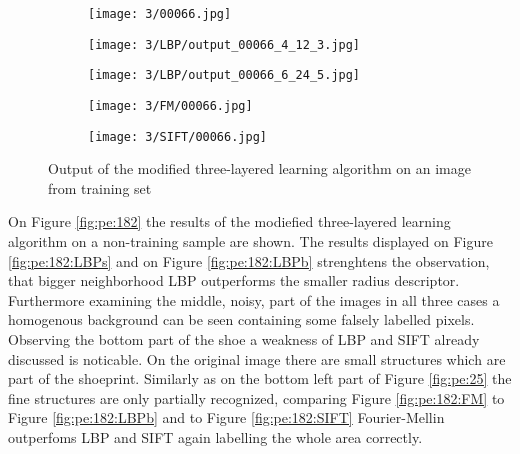 \documentclass[draft,final]{vutinfth} %
\begin{document}
\begin{figure}[h]
  \centering
  \begin{subfigure}[b]{0.19\columnwidth}
    \centering
    \texttt{[image: 3/00066.jpg]}
    \label{fig:pe:66:orig}
  \end{subfigure}
  \begin{subfigure}[b]{0.19\columnwidth}
    \centering
    \texttt{[image: 3/LBP/output\_00066\_4\_12\_3.jpg]}
    \label{fig:pe:66:LBPs}
  \end{subfigure}
  \begin{subfigure}[b]{0.19\columnwidth}
    \centering
    \texttt{[image: 3/LBP/output\_00066\_6\_24\_5.jpg]}
    \label{fig:pe:66:LBPb}
  \end{subfigure}
  \begin{subfigure}[b]{0.19\columnwidth}
    \centering
    \texttt{[image: 3/FM/00066.jpg]}
    \label{fig:pe:66:FM}
  \end{subfigure}
  \begin{subfigure}[b]{0.19\columnwidth}
    \centering
    \texttt{[image: 3/SIFT/00066.jpg]}
    \label{fig:pe:66:SIFT}
  \end{subfigure}
  \caption{Output of the modified three-layered learning algorithm on an image from training set}
  \label{fig:pe:66}
\end{figure}

\par
On Figure \ref{fig:pe:182} the results of the modiefied three-layered learning algorithm on a non-training sample are shown.
The results displayed on Figure \ref{fig:pe:182:LBPs} and on Figure \ref{fig:pe:182:LBPb} strenghtens the observation, that bigger neighborhood LBP outperforms the smaller radius descriptor.
Furthermore examining the middle, noisy, part of the images in all three cases a homogenous background can be seen containing some falsely labelled pixels.
Observing the bottom part of the shoe a weakness of LBP and SIFT already discussed is noticable.
On the original image there are small structures which are part of the shoeprint.
Similarly as on the bottom left part of Figure \ref{fig:pe:25} the fine structures are only partially recognized, comparing Figure \ref{fig:pe:182:FM} to Figure \ref{fig:pe:182:LBPb} and to Figure \ref{fig:pe:182:SIFT} Fourier-Mellin outperfoms LBP and SIFT again labelling the whole area correctly.
\end{document}
